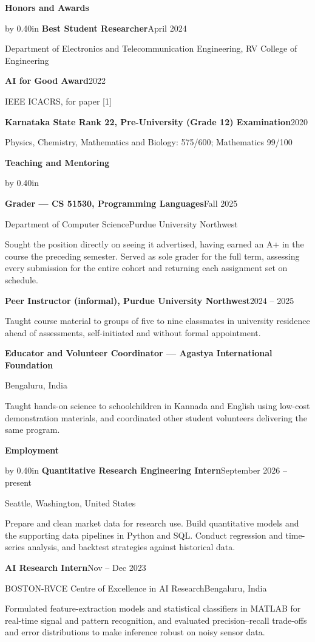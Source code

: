 \documentclass[10pt]{article}
\newcommand{\cvsection}[1]{%
  \vspace{8pt}%
  {\fontsize{11pt}{13pt}\selectfont\textbf{#1}}%
  \par\nobreak\vspace{4pt}%
}
\newenvironment{cvindent}{\par\advance\leftskip by 0.40in}{\par}
\newcommand{\cvrow}[2]{\noindent #1\hfill #2\par}
\newcommand{\cvdesc}[1]{\par #1\par\vspace{5.5pt}}
\begin{document}
\cvsection{Honors and Awards}
\begin{cvindent}
\cvrow{\textbf{Best Student Researcher}}{April 2024}
\cvrow{Department of Electronics and Telecommunication Engineering, RV College of Engineering}{}
\vspace{5pt}
\cvrow{\textbf{AI for Good Award}}{2022}
\cvrow{IEEE ICACRS, for paper [1]}{}
\vspace{5pt}
\cvrow{\textbf{Karnataka State Rank 22, Pre-University (Grade 12) Examination}}{2020}
\cvrow{Physics, Chemistry, Mathematics and Biology: 575/600; Mathematics 99/100}{}
\vspace{4pt}
\end{cvindent}

\cvsection{Teaching and Mentoring}
\begin{cvindent}

\cvrow{\textbf{Grader --- CS 51530, Programming Languages}}{Fall 2025}
\cvrow{Department of Computer Science}{Purdue University Northwest}
\cvdesc{Sought the position directly on seeing it advertised, having earned an A+ in the course the
preceding semester. Served as sole grader for the full term, assessing every submission for
the entire cohort and returning each assignment set on schedule.}

\cvrow{\textbf{Peer Instructor (informal), Purdue University Northwest}}{2024 -- 2025}
\cvdesc{Taught course material to groups of five to nine classmates in university residence ahead of
assessments, self-initiated and without formal appointment.}

\cvrow{\textbf{Educator and Volunteer Coordinator --- Agastya International Foundation}}{}
\cvrow{}{Bengaluru, India}
\cvdesc{Taught hands-on science to schoolchildren in Kannada and English using low-cost demonstration
materials, and coordinated other student volunteers delivering the same program.}
\end{cvindent}

\cvsection{Employment}
\begin{cvindent}
\cvrow{\textbf{Quantitative Research Engineering Intern}}{September 2026 -- present}
\cvrow{Seattle, Washington, United States}{}
\cvdesc{Prepare and clean market data for research use. Build quantitative models and the supporting
data pipelines in Python and SQL. Conduct regression and time-series analysis, and backtest strategies against historical data.}

\cvrow{\textbf{AI Research Intern}}{Nov -- Dec 2023}
\cvrow{BOSTON-RVCE Centre of Excellence in AI Research}{Bengaluru, India}
\cvdesc{Formulated feature-extraction models and statistical classifiers in MATLAB for real-time signal and pattern recognition, and evaluated precision--recall trade-offs and error distributions to make inference robust on noisy sensor data.}
\end{cvindent}
\end{document}
